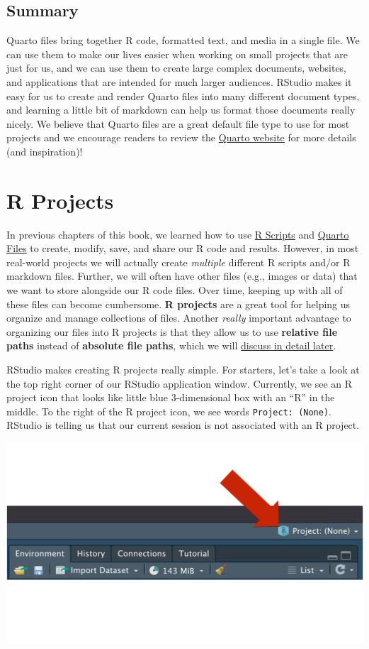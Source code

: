 \documentclass[
  letterpaper,
  DIV=11,
  numbers=noendperiod]{scrreprt}
\begin{document}
\section{Summary}\label{summary-2}

Quarto files bring together R code, formatted text, and media in a
single file. We can use them to make our lives easier when working on
small projects that are just for us, and we can use them to create large
complex documents, websites, and applications that are intended for much
larger audiences. RStudio makes it easy for us to create and render
Quarto files into many different document types, and learning a little
bit of markdown can help us format those documents really nicely. We
believe that Quarto files are a great default file type to use for most
projects and we encourage readers to review the
\href{https://quarto.org/}{Quarto website} for more details (and
inspiration)!

\chapter{R Projects}\label{r-projects}

In previous chapters of this book, we learned how to use
\href{../r_scripts/r_scripts.qmd}{R Scripts} and
\href{../quarto_files/quarto_files.qmd}{Quarto Files} to create, modify,
save, and share our R code and results. However, in most real-world
projects we will actually create \emph{multiple} different R scripts
and/or R markdown files. Further, we will often have other files (e.g.,
images or data) that we want to store alongside our R code files. Over
time, keeping up with all of these files can become cumbersome.
\textbf{R projects} are a great tool for helping us organize and manage
collections of files. Another \emph{really} important advantage to
organizing our files into R projects is that they allow us to use
\textbf{relative file paths} instead of \textbf{absolute file paths},
which we will \hyperref[file-paths]{discuss in detail later}.

RStudio makes creating R projects really simple. For starters, let's
take a look at the top right corner of our RStudio application window.
Currently, we see an R project icon that looks like little blue
3-dimensional box with an ``R'' in the middle. To the right of the R
project icon, we see words \texttt{Project:\ (None)}. RStudio is telling
us that our current session is not associated with an R project.

\includegraphics{chapters/r_projects/create_01_icon.png}
\end{document}
